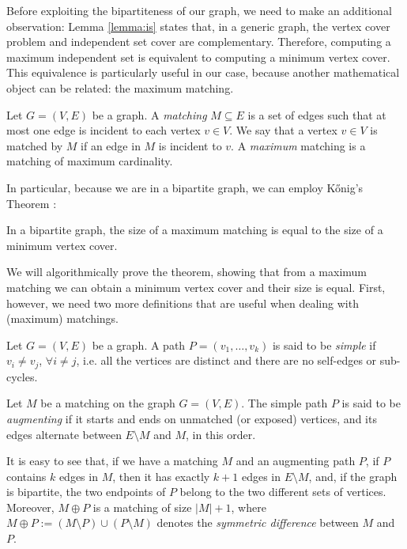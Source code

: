 Before exploiting the bipartiteness of our graph, we need to make an additional observation: Lemma \ref{lemma:is} states that, in a generic graph, the vertex cover problem and independent set cover are complementary. Therefore, computing a maximum independent set is equivalent to computing a minimum vertex cover. This equivalence is particularly useful in our case, because another mathematical object can be related: the maximum matching.

\begin{definition}[Matching]
	Let $G=(V,E)$ be a graph. A \emph{matching} $M \subseteq E$ is a set of edges such that at most one edge is incident to each vertex $v \in V$. We say that a vertex $v \in V$ is matched by $M$ if an edge in $M$ is incident to $v$. A \emph{maximum} matching is a matching of maximum cardinality.
\end{definition}

In particular, because we are in a bipartite graph, we can employ K\H{o}nig's Theorem \cite{konig}:

\begin{theorem}[K\H{o}nig]
In a bipartite graph, the size of a maximum matching is equal to the size of a minimum vertex cover. \label{th:konig}
\end{theorem}

We will algorithmically prove the theorem, showing that from a maximum matching we can obtain a minimum vertex cover and their size is equal. First, however, we need two more definitions that are useful when dealing with (maximum) matchings.

\begin{definition}
	Let $G=(V,E)$ be a graph. A path $P=(v_1,\dots,v_k)$ is said to be \emph{simple} if $v_i \neq v_j$, $\forall i \neq j$, i.e. all the vertices are distinct and there are no self-edges or sub-cycles. \label{def:simple_path} 
\end{definition}

\begin{definition}
	Let $M$ be a matching on the graph $G=(V,E)$. The simple path $P$ is said to be \emph{augmenting} if it starts and ends on unmatched (or exposed) vertices, and its edges alternate between $E \setminus M$ and $M$, in this order.\label{def:augmenting_path}
\end{definition}

It is easy to see that, if we have a matching $M$ and an augmenting path $P$, if $P$ contains $k$ edges in $M$, then it has exactly $k+1$ edges in $E\setminus M$, and, if the graph is bipartite, the two endpoints of $P$ belong to the two different sets of vertices. Moreover, $M \oplus P$ is a matching of size $|M|+1$, where $M \oplus P := (M \setminus P) \cup (P \setminus M)$ denotes the \emph{symmetric difference} between $M$ and $P$. 

